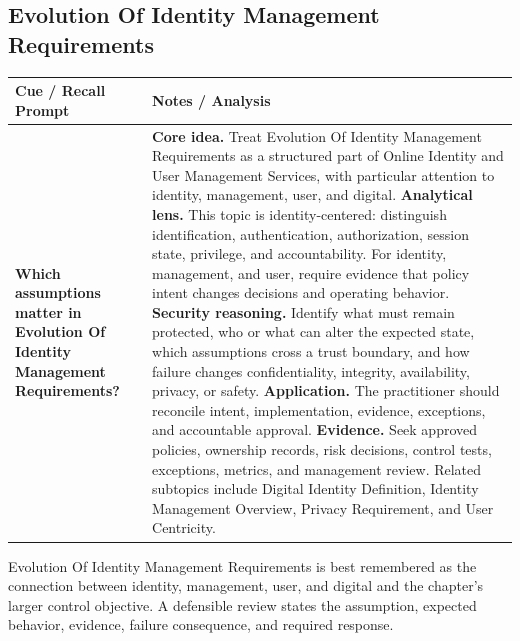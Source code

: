 \documentclass[11pt]{article}
\newcommand{\CornellHeader}{%
\rowcolor{Navy}\color{white}\bfseries Cue / Recall Prompt & \color{white}\bfseries Notes / Analysis\\\hline}
\newcommand{\CornellRow}[2]{%
\cellcolor{CueGray}\RaggedRight\textbf{#1} & \RaggedRight #2\\\hline}
\begin{document}
\subsection*{Evolution Of Identity Management Requirements}
\begin{longtable}{>{\RaggedRight\arraybackslash}p{}|>{\RaggedRight\arraybackslash}p{}}
\CornellHeader
\CornellRow{Which assumptions matter in Evolution Of Identity Management Requirements?}{\textbf{Core idea.} Treat Evolution Of Identity Management Requirements as a structured part of Online Identity and User Management Services, with particular attention to identity, management, user, and digital. \textbf{Analytical lens.} This topic is identity-centered: distinguish identification, authentication, authorization, session state, privilege, and accountability. For identity, management, and user, require evidence that policy intent changes decisions and operating behavior. \textbf{Security reasoning.} Identify what must remain protected, who or what can alter the expected state, which assumptions cross a trust boundary, and how failure changes confidentiality, integrity, availability, privacy, or safety. \textbf{Application.} The practitioner should reconcile intent, implementation, evidence, exceptions, and accountable approval. \textbf{Evidence.} Seek approved policies, ownership records, risk decisions, control tests, exceptions, metrics, and management review. Related subtopics include Digital Identity Definition, Identity Management Overview, Privacy Requirement, and User Centricity.}
\end{longtable}
\begin{topicsummary}
Evolution Of Identity Management Requirements is best remembered as the connection between identity, management, user, and digital and the chapter's larger control objective. A defensible review states the assumption, expected behavior, evidence, failure consequence, and required response.
\end{topicsummary}
\end{document}
